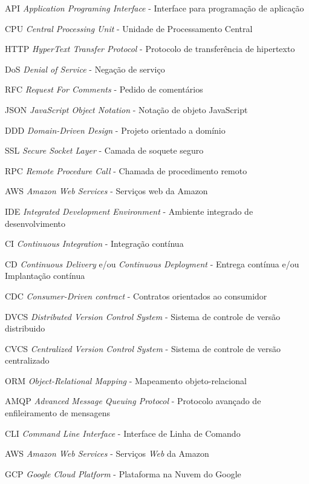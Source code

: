 
\begin{siglas}
	\item[API]{\emph{Application Programing Interface} - Interface para programação de aplicação}
	\item[CPU]{\emph{Central Processing Unit} - Unidade de Processamento Central}
	\item[HTTP]{\emph{HyperText Transfer Protocol} - Protocolo de transferência de hipertexto}
	\item[DoS]{\emph{Denial of Service} - Negação de serviço}
	\item[RFC]{\emph{Request For Comments} - Pedido de comentários}
	\item[JSON]{\emph{JavaScript Object Notation} - Notação de objeto JavaScript}
	\item[DDD]{\emph{Domain-Driven Design} - Projeto orientado a domínio}
	\item[SSL]{\emph{Secure Socket Layer} - Camada de soquete seguro}
	\item[RPC]{\emph{Remote Procedure Call} - Chamada de procedimento remoto} 
	\item[AWS]{\emph{Amazon Web Services} - Serviços web da Amazon} 
	\item[IDE]{\emph{Integrated Development Environment} - Ambiente integrado de desenvolvimento} 
	\item[CI]{\emph{Continuous Integration} - Integração contínua}
	\item[CD]{\emph{Continuous Delivery} e/ou \emph{Continuous Deployment} - Entrega contínua e/ou Implantação contínua}
	\item[CDC]{\emph{Consumer-Driven contract} - Contratos orientados ao consumidor}
	\item[DVCS]{\emph{Distributed Version Control System} - Sistema de controle de versão distribuido}
	\item[CVCS]{\emph{Centralized Version Control System} - Sistema de controle de versão centralizado}
	\item[ORM]{\emph{Object-Relational Mapping} - Mapeamento objeto-relacional}
	\item[AMQP]{\emph{Advanced Message Queuing Protocol} - Protocolo avançado de enfileiramento de mensagens}
	\item[CLI]{\emph{Command Line Interface} - Interface de Linha de Comando}
	\item[AWS]{\emph{Amazon Web Services} - Serviços \emph{Web} da Amazon}
	\item[GCP]{\emph{Google Cloud Platform} - Plataforma na Nuvem do Google}   
\end{siglas}